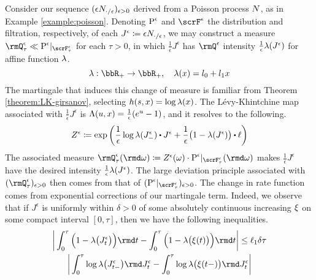 \begin{example}
  \label{example:hawkes}
  Consider our sequence $(\epsilon N_{\cdot/\epsilon})_{\epsilon>0}$ derived from a Poisson process $N$, as in Example \ref{example:poisson}.
  Denoting ${\operatorname{P}}^\epsilon$ and $\scrF^\epsilon$ the distribution and filtration, respectively, of each $J^\epsilon \coloneqq \epsilon N_{\cdot/\epsilon}$, we may construct a measure $\mgPrb^\epsilon_\tau \ll \Prb^\epsilon|_{\scrF^\epsilon_\tau}$ for each $\tau > 0$, in which $\frac1\epsilon J^\epsilon$ has $\mgPrb^\epsilon$ intensity $\frac1\epsilon\lambda(J^\epsilon)$ for affine function $\lambda$.
  \begin{equation*}
    \affInt: \bbR_+ \rightarrow \bbR_+, \quad \affInt(\stateVar) = \affIntPart_0 + \affIntPart_1 \stateVar
  \end{equation*}
  The martingale that induces this change of measure is familiar from Theorem \ref{theorem:LK-girsanov}, selecting $h(s, x) = \log\lambda(x)$.
  The L\'evy-Khintchine map associated with $\frac1\epsilon J^\epsilon$ is $\Lambda(u, x) = \frac1\epsilon (e^u - 1)$, and it resolves to the following.
  \begin{equation*}
    \mgDensity^\epsilon \defeq \exp\bigg( \frac1\epsilon \log\affInt(J^\epsilon_-) \shortInt J^\epsilon + \frac1\epsilon\big( 1 - \affInt(J^\epsilon) \big) \shortInt \leb \bigg)
  \end{equation*}
  The associated measure $\mgPrb^\epsilon_\tau(\rmd\omega) \defeq \mgDensity^\epsilon(\omega) \cdot \Prb^\epsilon|_{\scrF^\epsilon_\tau}(\rmd\omega)$ makes $\frac1\epsilon J^\epsilon$ have the desired intensity $\frac1\epsilon\lambda(J^\epsilon)$.
  The large deviation principle associated with $(\mgPrb^\epsilon_\tau)_{\epsilon>0}$ then comes from that of $(\Prb^\epsilon|_{\scrF^\epsilon_\tau})_{\epsilon>0}$.
  The change in rate function comes from exponential corrections of our martingale term.
  Indeed, we observe that if $J^\epsilon$ is uniformly within $\delta > 0$ of some absolutely continuous increasing $\xi$ on some compact interval $[0,\tau]$, then we have the following inequalities.
  \begin{gather*}
    \bigg| \int_0^\tau \Big( 1 - \affInt\big(J^\epsilon_t\big) \Big) \rmd t - \int_0^\tau \Big( 1 - \affInt\big( \pathVar(t) \big) \Big) \rmd t \bigg|
    \leq \ell_1 \delta \tau \\
    \begin{aligned}[t]
      &\bigg| \int_0^\tau \log\affInt\big(J^\epsilon_{t-}\big) \rmd J^\epsilon_t - \int_0^\tau \log\affInt\big(\pathVar(t-)\big) \rmd J^\epsilon_t \bigg| \\

\end{aligned}
\end{gather*}
\end{example}
